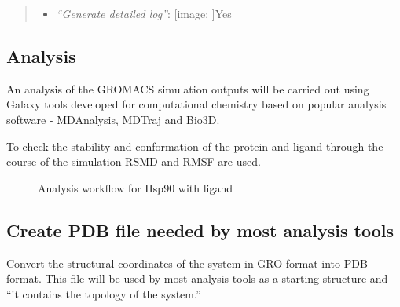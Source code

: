 \documentclass[twocolumn]{bmcart}%
\def\texttt{[image: ]}
\providecommand{\tightlist}{%
  \setlength{\itemsep}{0pt}\setlength{\parskip}{0pt}}
\begin{document}
\begin{quote}
\begin{enumerate}
\begin{itemize}
\begin{itemize}
      \begin{itemize}
      \tightlist
      \item
        \emph{``Temperature /K''}: \texttt{300}
      \item
        \emph{``Step length in ps''}: \texttt{0.001}
      \item
        \emph{``Number of steps that elapse between saving data points
        (velocities, forces, energies)''}: \texttt{1000}
      \item
        \emph{``Number of steps for the simulation''}: \texttt{1000000}
      \end{itemize}
    \end{itemize}
  \item
    \emph{``Generate detailed log''}: \texttt{Yes}
  \end{itemize}
\end{enumerate}


\end{quote}

\hypertarget{analysis}{%
\subsection*{Analysis}\label{analysis}}

An analysis of the GROMACS simulation outputs will be carried out using Galaxy tools developed for computational chemistry\cite{senapathi_biomolecular_2019} based on popular analysis software - MDAnalysis\cite{michaudagrawal_mdanalysis_2011}, MDTraj\cite{mcgibbon_mdtraj_2015} and Bio3D\cite{skjaerven_integrating_2014}.

To check the stability and conformation of the protein and ligand through the course of the simulation RSMD and RMSF are used.


\begin{figure}[h!]
\caption{
    Analysis workflow for Hsp90 with ligand}
\centering
\end{figure}




\hypertarget{create-pdb-file-needed-by-most-analysis-tools}{%
\subsection{Create PDB file needed by most analysis
tools}\label{create-pdb-file-needed-by-most-analysis-tools}}

Convert the structural coordinates of the system in GRO format into PDB
format. This file will be used by most analysis tools as a starting
structure and ``it contains the topology of the system.''
\end{document}
